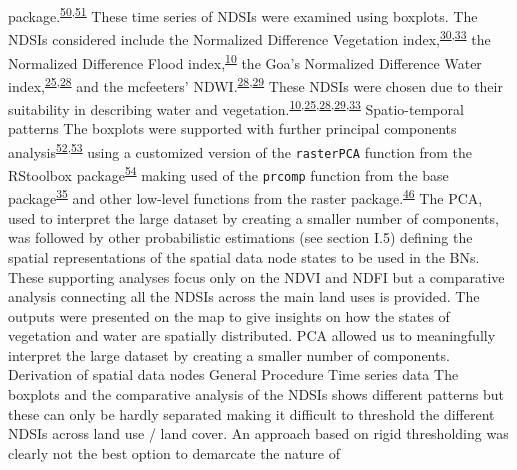 \documentclass[12pt,oneside]{article}
\begin{document}
package.\textsuperscript{\protect\hyperlink{ref-Bivand_et_al_2013}{50},\protect\hyperlink{ref-Pebesma_Bivand_2005}{51}}
These time series of NDSIs were examined using boxplots. The NDSIs
considered include the Normalized Difference Vegetation
index,\textsuperscript{\protect\hyperlink{ref-Rouse_et_al_1973}{30},\protect\hyperlink{ref-Tucker_1979}{33}}
the Normalized Difference Flood
index,\textsuperscript{\protect\hyperlink{ref-Boschetti_et_al_2014}{10}}
the Goa's Normalized Difference Water
index,\textsuperscript{\protect\hyperlink{ref-Gao_1996}{25},\protect\hyperlink{ref-Ji_et_al_2009}{28}}
and the mcfeeters'
NDWI.\textsuperscript{\protect\hyperlink{ref-Ji_et_al_2009}{28},\protect\hyperlink{ref-McFeeters_1996}{29}}
These NDSIs were chosen due to their suitability in describing water and
vegetation.\textsuperscript{\protect\hyperlink{ref-Boschetti_et_al_2014}{10},\protect\hyperlink{ref-Gao_1996}{25},\protect\hyperlink{ref-Ji_et_al_2009}{28},\protect\hyperlink{ref-McFeeters_1996}{29},\protect\hyperlink{ref-Tucker_1979}{33}}
Spatio-temporal patterns The boxplots were supported with further
principal components
analysis\textsuperscript{\protect\hyperlink{ref-Mardia_et_al_1979}{52},\protect\hyperlink{ref-Pearson_1901}{53}}
using a customized version of the \texttt{rasterPCA} function from the
RStoolbox
package\textsuperscript{\protect\hyperlink{ref-Leutner_et_al_2019}{54}}
making used of the \texttt{prcomp} function from the base
package\textsuperscript{\protect\hyperlink{ref-RCoreTeam_2018}{35}} and
other low-level functions from the raster
package.\textsuperscript{\protect\hyperlink{ref-Hijmans_2019}{46}} The
PCA, used to interpret the large dataset by creating a smaller number of
components, was followed by other probabilistic estimations (see section
I.5) defining the spatial representations of the spatial data node
states to be used in the BNs. These supporting analyses focus only on
the NDVI and NDFI but a comparative analysis connecting all the NDSIs
across the main land uses is provided. The outputs were presented on the
map to give insights on how the states of vegetation and water are
spatially distributed. PCA allowed us to meaningfully interpret the
large dataset by creating a smaller number of components. Derivation of
spatial data nodes General Procedure Time series data The boxplots and
the comparative analysis of the NDSIs shows different patterns but these
can only be hardly separated making it difficult to threshold the
different NDSIs across land use / land cover. An approach based on rigid
thresholding was clearly not the best option to demarcate the nature of
\end{document}
